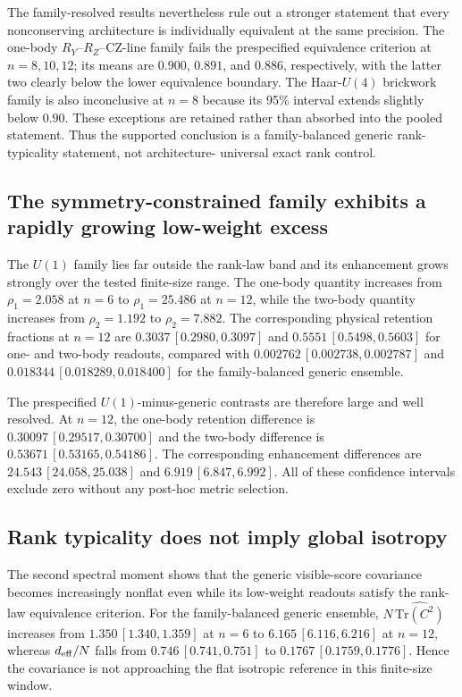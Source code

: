 The family-resolved results nevertheless rule out a stronger statement
that every nonconserving architecture is individually equivalent at the
same precision.  The one-body $R_Y$--$R_Z$--CZ-line family fails the
prespecified equivalence criterion at $n=8,10,12$; its means are
$0.900$, $0.891$, and $0.886$, respectively, with the latter two clearly
below the lower equivalence boundary.  The Haar-$U(4)$ brickwork family
is also inconclusive at $n=8$ because its 95\% interval extends slightly
below $0.90$.  These exceptions are retained rather than absorbed into
the pooled statement.  Thus the supported conclusion is a
family-balanced generic rank-typicality statement, not architecture-
universal exact rank control.

\subsection{The symmetry-constrained family exhibits a rapidly growing low-weight excess}

The $U(1)$ family lies far outside the rank-law band and its enhancement
grows strongly over the tested finite-size range.  The one-body
quantity increases from $\rho_1=2.058$ at $n=6$ to
$\rho_1=25.486$ at $n=12$, while the two-body quantity increases from
$\rho_2=1.192$ to $\rho_2=7.882$.  The corresponding physical retention
fractions at $n=12$ are $0.3037\,[0.2980,0.3097]$ and
$0.5551\,[0.5498,0.5603]$ for one- and two-body readouts, compared with
$0.002762\,[0.002738,0.002787]$ and
$0.018344\,[0.018289,0.018400]$ for the family-balanced generic ensemble.

The prespecified $U(1)$-minus-generic contrasts are therefore large and
well resolved.  At $n=12$, the one-body retention difference is
$0.30097\,[0.29517,0.30700]$ and the two-body difference is
$0.53671\,[0.53165,0.54186]$.  The corresponding enhancement differences
are $24.543\,[24.058,25.038]$ and $6.919\,[6.847,6.992]$.
All of these confidence intervals exclude zero without any post-hoc
metric selection.

\subsection{Rank typicality does not imply global isotropy}

The second spectral moment shows that the generic visible-score
covariance becomes increasingly nonflat even while its low-weight
readouts satisfy the rank-law equivalence criterion.  For the
family-balanced generic ensemble,
$N\,\widehat{\mathrm{Tr}(C^2)}$ increases from
$1.350\,[1.340,1.359]$ at $n=6$ to
$6.165\,[6.116,6.216]$ at $n=12$, whereas
$d_{\rm eff}/N$ falls from $0.746\,[0.741,0.751]$ to
$0.1767\,[0.1759,0.1776]$.  Hence the covariance is not approaching the
flat isotropic reference in this finite-size window.

